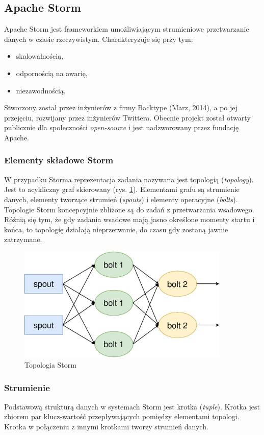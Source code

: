 \subsection{Apache Storm}
Apache Storm jest frameworkiem umożliwiającym strumieniowe przetwarzanie danych w czasie rzeczywistym.
Charakteryzuje się przy tym:
\begin{itemize}
  \item skalowalnością,
  \item odpornością na awarię,
  \item niezawodnością.
\end{itemize}
Stworzony został przez inżynierów z firmy
Backtype (Marz, 2014),
a po jej przejęciu, rozwijany przez inżynierów Twittera.
Obecnie projekt został otwarty publicznie dla społeczności \textit{open-source}
i jest nadzworowany przez fundację Apache.

\subsubsection*{Elementy składowe Storm}
\label{subs:StormElemets}
W przypadku Storma reprezentacja zadania nazywana jest topologią (\textit{topology}).
Jest to acykliczny graf skierowany (rys. \ref{fig:StormTopology}).
Elementami grafu są strumienie danych,
elementy tworzące strumień (\textit{spouts})
i elementy operacyjne (\textit{bolts}).
Topologie Storm koncepcyjnie zbliżone są do zadań z przetwarzania wsadowego.
Różnią się tym,
że gdy zadania wsadowe mają jasno określone momenty startu i końca,
to topologię działają nieprzerwanie, do czasu gdy zostaną jawnie zatrzymane.
\begin{figure}[htbp]
  \centering
  \includegraphics[width=0.9\textwidth]{img/storm}
  \caption{Topologia Storm}
  \label{fig:StormTopology}
\end{figure}

\subsubsection*{Strumienie}
Podstawową strukturą danych w systemach Storm jest krotka (\textit{tuple}).
Krotka jest zbiorem par klucz-wartość przepływających pomiędzy elementami topologi.
Krotka w połączeniu z innymi krotkami tworzy strumień danych.
